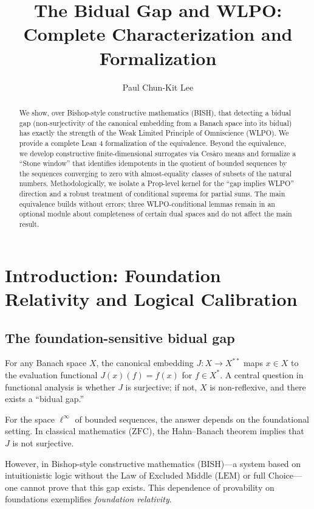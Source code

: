 \documentclass{lmcs}
\title[The Bidual Gap and WLPO]{The Bidual Gap and WLPO: Complete Characterization and Formalization}
\author[P.~C.-K.~Lee]{Paul Chun-Kit Lee}
\newcommand{\linf}{\ell^\infty}
\newcommand{\BISH}{\mathrm{BISH}}
\newcommand{\LEM}{\mathrm{LEM}}
\newcommand{\ZFC}{\mathrm{ZFC}}
\begin{document}
\begin{abstract}
We show, over Bishop-style constructive mathematics (BISH), that detecting a bidual gap (non-surjectivity of the canonical embedding from a Banach space into its bidual) has exactly the strength of the Weak Limited Principle of Omniscience (WLPO). We provide a complete Lean 4 formalization of the equivalence. Beyond the equivalence, we develop constructive finite-dimensional surrogates via Cesàro means and formalize a ``Stone window'' that identifies idempotents in the quotient of bounded sequences by the sequences converging to zero with almost-equality classes of subsets of the natural numbers. Methodologically, we isolate a Prop-level kernel for the ``gap implies WLPO'' direction and a robust treatment of conditional suprema for partial sums. The main equivalence builds without errors; three WLPO-conditional lemmas remain in an optional module about completeness of certain dual spaces and do not affect the main result.
\end{abstract}

\maketitle

\tableofcontents

\section{Introduction: Foundation Relativity and Logical Calibration}

\subsection{The foundation-sensitive bidual gap}

For any Banach space $X$, the canonical embedding $J:X\to X^{**}$ maps $x\in X$ to the evaluation functional $J(x)(f)=f(x)$ for $f\in X^*$. A central question in functional analysis is whether $J$ is surjective; if not, $X$ is non-reflexive, and there exists a ``bidual gap.''

For the space $\linf$ of bounded sequences, the answer depends on the foundational setting. In classical mathematics ($\ZFC$), the Hahn--Banach theorem implies that $J$ is not surjective.

However, in Bishop-style constructive mathematics ($\BISH$)---a system based on intuitionistic logic without the Law of Excluded Middle ($\LEM$) or full Choice---one cannot prove that this gap exists. This dependence of provability on foundations exemplifies \emph{foundation relativity}.
\end{document}
